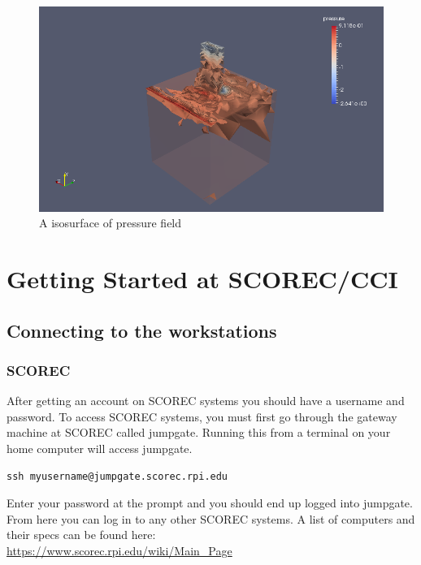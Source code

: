\documentclass{article}
\begin{document}
\begin{figure}[h!]
\centering
\includegraphics[width=1\textwidth]{res2}
\caption{A isosurface of pressure field}
\label{fig:6}
\end{figure}

\pagebreak


\appendix


\section{Getting Started at SCOREC/CCI}
\label{ch:1}
\subsection{Connecting to the workstations}
\label{ch:1.1}
\subsubsection{SCOREC}
After getting an account on SCOREC systems you should have a username and password. To access SCOREC systems, you must first go through the gateway machine at SCOREC called jumpgate. Running this from a terminal on your home computer will access jumpgate.
\begin{lstlisting}
ssh myusername@jumpgate.scorec.rpi.edu
\end{lstlisting}
Enter your password at the prompt and you should end up logged into jumpgate. From here you can log in to any other SCOREC systems. A list of computers and their specs can be found here:\\
\url{https://www.scorec.rpi.edu/wiki/Main_Page}
\end{document}
